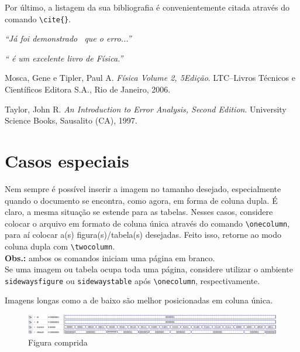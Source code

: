 \documentclass[9pt, twocolumn]{extarticle}
\begin{document}
		Por último, a listagem da sua bibliografia é convenientemente citada através do comando \verb|\cite{}|.		
				
		\textit{``Já foi demonstrado~\cite{taylor} que o erro...''}	
		
		\textit{``\cite{tipler} é um excelente livro de Física.''}						
				
	\begin{thebibliography}{2} %
			Mosca, Gene e Tipler, Paul A. 											%
			\textit{Física Volume 2, 5\textordfeminine Edição}. 					%
			LTC--Livros Técnicos e Científicos Editora S.A., Rio de Janeiro, 2006. 	%
		
			Taylor, John R.												%
			\textit{An Introduction to Error Analysis, Second Edition}.	%
			University Science Books, Sausalito (CA), 1997. 			%
	\end{thebibliography}
				
	\section{Casos especiais}	
	\label{sec:casos}
		Nem sempre é possível inserir a imagem no tamanho desejado, especialmente quando o documento se encontra, como agora, em forma de coluna dupla. 
		É claro, a mesma situação se estende para as tabelas.
		Nesses casos, considere colocar o arquivo em formato de coluna única através do comando 
		\verb|\onecolumn|, para aí colocar a(s) figura(s)/tabela(s) desejadas.
		Feito isso, retorne ao modo coluna dupla com \verb|\twocolumn|.\\
		
		\textbf{Obs.:} ambos os comandos iniciam uma página em branco.\\
		
		Se uma imagem ou tabela ocupa toda uma página, considere utilizar o ambiente {\tt sidewaysfigure} ou {\tt sidewaystable} após \verb|\onecolumn|, respectivamente.
		
		\onecolumn
		Imagens longas como a de baixo são melhor posicionadas em coluna única.
		
		\begin{figure}[H]\centering
			\includegraphics[width=\textwidth]
			{figuras/forma de onda.png}
			\caption{%
				Figura comprida
			}
		\end{figure}   
		
\end{document}
